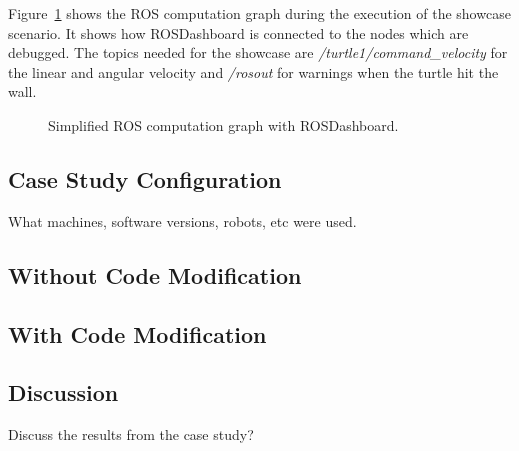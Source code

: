 Figure~\ref{rosgraph_simple} shows the ROS computation graph during the execution of the showcase scenario. It shows how ROSDashboard is connected to the nodes which are debugged. The topics needed for the showcase are \emph{/turtle1/command\_velocity} for the linear and angular velocity and \emph{/rosout} for warnings when the turtle hit the wall.

\begin{figure}[thpb]
  \centering
  \caption{Simplified ROS computation graph with ROSDashboard.}
  \label{rosgraph_simple}
\end{figure}

\subsection{Case Study Configuration}
What machines, software versions, robots, etc were used.

\subsection{Without Code Modification}
\subsection{With Code Modification}

\subsection{Discussion}
Discuss the results from the case study?
